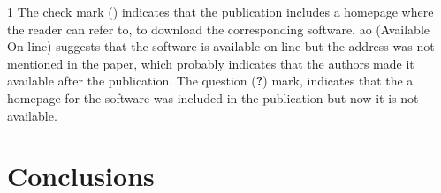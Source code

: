 \documentclass[conference]{IEEEtran}
\newcommand{\tick}{\ding{52}}
\begin{document}
\begin{table}
\begin{threeparttable}
\begin{small}
{\begin{tabular}{l|c|ccc}
	\hline
    \end{tabular}}
    \begin{tablenotes}
	\begin{footnotesize}
       \item[1] The check mark (\tick) indicates that the publication
       includes a homepage where the reader can refer to, to
       download the corresponding software. {\sc ao} (Available On-line) suggests
       that the software is available on-line but the
       address was not mentioned in the paper, which probably indicates that
       the authors made it available after the publication. The question ({\bf ?})
       mark, indicates that the a homepage for the software was included
       in the publication but now it is not available.
	\end{footnotesize}
    \end{tablenotes}
    \end{small}
    \end{threeparttable}
\end{table}

\section{Conclusions}




\end{document}
